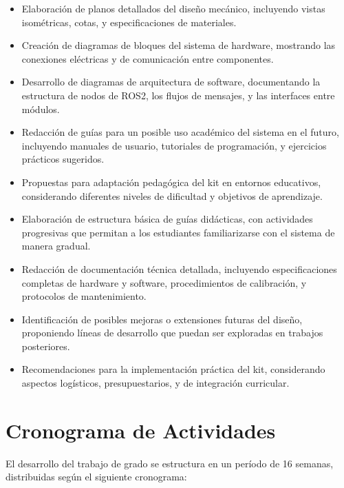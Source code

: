 \begin{itemize}
    \item Elaboración de planos detallados del diseño mecánico, incluyendo vistas isométricas, cotas, y especificaciones de materiales.
    
    \item Creación de diagramas de bloques del sistema de hardware, mostrando las conexiones eléctricas y de comunicación entre componentes.
    
    \item Desarrollo de diagramas de arquitectura de software, documentando la estructura de nodos de ROS2, los flujos de mensajes, y las interfaces entre módulos.
    
    \item Redacción de guías para un posible uso académico del sistema en el futuro, incluyendo manuales de usuario, tutoriales de programación, y ejercicios prácticos sugeridos.
    
    \item Propuestas para adaptación pedagógica del kit en entornos educativos, considerando diferentes niveles de dificultad y objetivos de aprendizaje.
    
    \item Elaboración de estructura básica de guías didácticas, con actividades progresivas que permitan a los estudiantes familiarizarse con el sistema de manera gradual.
    
    \item Redacción de documentación técnica detallada, incluyendo especificaciones completas de hardware y software, procedimientos de calibración, y protocolos de mantenimiento.
    
    \item Identificación de posibles mejoras o extensiones futuras del diseño, proponiendo líneas de desarrollo que puedan ser exploradas en trabajos posteriores.
    
    \item Recomendaciones para la implementación práctica del kit, considerando aspectos logísticos, presupuestarios, y de integración curricular.
\end{itemize}

\section{Cronograma de Actividades}

El desarrollo del trabajo de grado se estructura en un período de 16 semanas, distribuidas según el siguiente cronograma:

